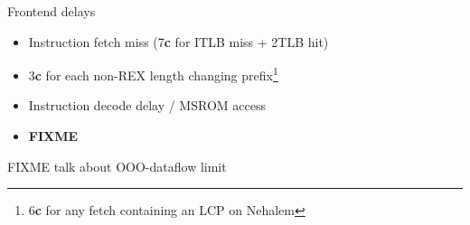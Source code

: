 \documentclass[mathserif,xcolor={dvipsnames,table}]{beamer}
\begin{document}
\begin{frame}{Frontend delays}
\begin{itemize}
\item Instruction fetch miss (7\textbf{c} for ITLB miss + 2TLB hit)
\item 3\textbf{c} for each non-REX length changing prefix\footnote{6\textbf{c} for any fetch containing an LCP on Nehalem}
\item Instruction decode delay / MSROM access
\item \huge\textbf{FIXME}
\end{itemize}
\end{frame}

\begin{frame}
\huge FIXME talk about OOO-dataflow limit
\end{frame}
\end{document}
